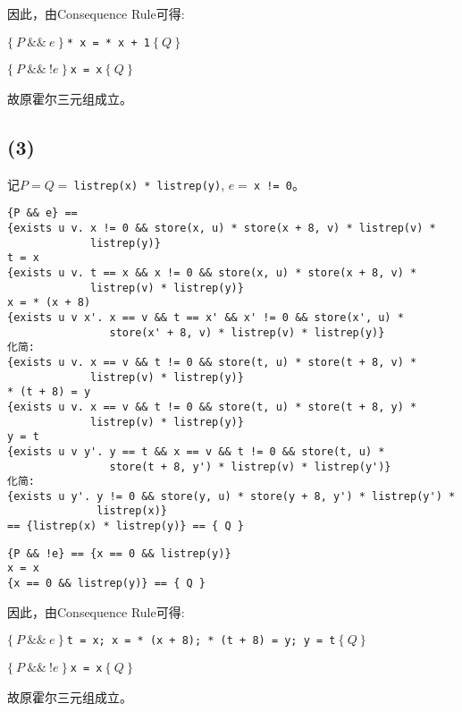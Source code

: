 \documentclass[11pt]{article}
\begin{document}
      因此，由Consequence Rule可得:

      \begin{center}
        $\{\ P\ \&\&\ e\ \}\ $\texttt{* x = * x + 1}$\ \{\ Q\ \}$

        $\{\ P\ \&\&\ !e\ \}\ $\texttt{x = x}$\ \{\ Q\ \}$
      \end{center}

      故原霍尔三元组成立。

    \subsection*{(3)}

      记$P=Q=\ $\texttt{listrep(x) * listrep(y)}, $e=\ $\texttt{x != 0}。
      \begin{lstlisting}
{P && e} ==
{exists u v. x != 0 && store(x, u) * store(x + 8, v) * listrep(v) *
             listrep(y)}
t = x
{exists u v. t == x && x != 0 && store(x, u) * store(x + 8, v) *
             listrep(v) * listrep(y)}
x = * (x + 8)
{exists u v x'. x == v && t == x' && x' != 0 && store(x', u) *
                store(x' + 8, v) * listrep(v) * listrep(y)}
化简:
{exists u v. x == v && t != 0 && store(t, u) * store(t + 8, v) *
             listrep(v) * listrep(y)}
* (t + 8) = y
{exists u v. x == v && t != 0 && store(t, u) * store(t + 8, y) *
             listrep(v) * listrep(y)}
y = t
{exists u v y'. y == t && x == v && t != 0 && store(t, u) *
                store(t + 8, y') * listrep(v) * listrep(y')}
化简:
{exists u y'. y != 0 && store(y, u) * store(y + 8, y') * listrep(y') *
              listrep(x)}
== {listrep(x) * listrep(y)} == { Q }
      \end{lstlisting}
      \begin{lstlisting}
{P && !e} == {x == 0 && listrep(y)}
x = x
{x == 0 && listrep(y)} == { Q }
      \end{lstlisting}

      因此，由Consequence Rule可得:

      \begin{center}
        $\{\ P\ \&\&\ e\ \}\ $\texttt{t = x; x = * (x + 8); * (t + 8) = y; y = t}$\ \{\ Q\ \}$

        $\{\ P\ \&\&\ !e\ \}\ $\texttt{x = x}$\ \{\ Q\ \}$
      \end{center}

      故原霍尔三元组成立。
\end{document}
